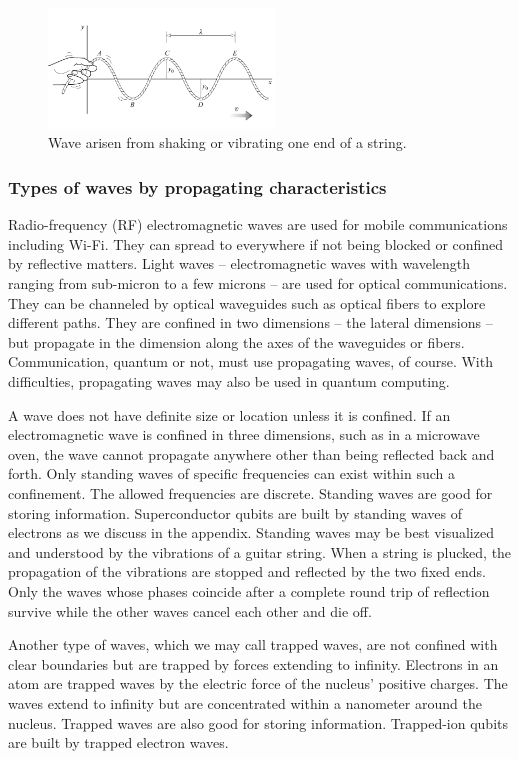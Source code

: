 \begin{figure}[ht]
\includegraphics[width=6cm]{pic/wave-in-a-string.png}
\caption{Wave arisen from shaking or vibrating one end of a string.}
\label{String}
\end{figure}

\subsubsection{Types of waves by propagating characteristics}
Radio-frequency (RF) electromagnetic waves are used for mobile communications including Wi-Fi. They can spread to everywhere if not being blocked or confined by reflective matters. Light waves -- electromagnetic waves with wavelength ranging from sub-micron to a few microns -- are used for optical communications. They can be channeled by optical waveguides such as optical fibers to explore different paths. They are confined in two dimensions -- the lateral dimensions -- but propagate in the dimension along the axes of the waveguides or fibers. Communication, quantum or not, must use propagating waves, of course. With difficulties, propagating waves may also be used in quantum computing.

A wave does not have definite size or location unless it is confined. If an electromagnetic wave is confined in three dimensions, such as in a microwave oven, the wave cannot propagate anywhere other than being reflected back and forth. Only standing waves of specific frequencies can exist within such a confinement. The allowed frequencies are discrete. Standing waves are good for storing information. Superconductor qubits are built by standing waves of electrons as we discuss in the appendix. Standing waves may be best visualized and understood by the vibrations of a guitar string. When a string is plucked, the propagation of the vibrations are stopped and reflected by the two fixed ends. Only the waves whose phases coincide after a complete round trip of reflection survive while the other waves cancel each other and die off.

Another type of waves, which we may call trapped waves, are not confined with clear boundaries but are trapped by forces extending to infinity. Electrons in an atom are trapped waves by the electric force of the nucleus' positive charges. The waves extend to infinity but are concentrated within a nanometer around the nucleus. Trapped waves are also good for storing information. Trapped-ion qubits are built by trapped electron waves.

